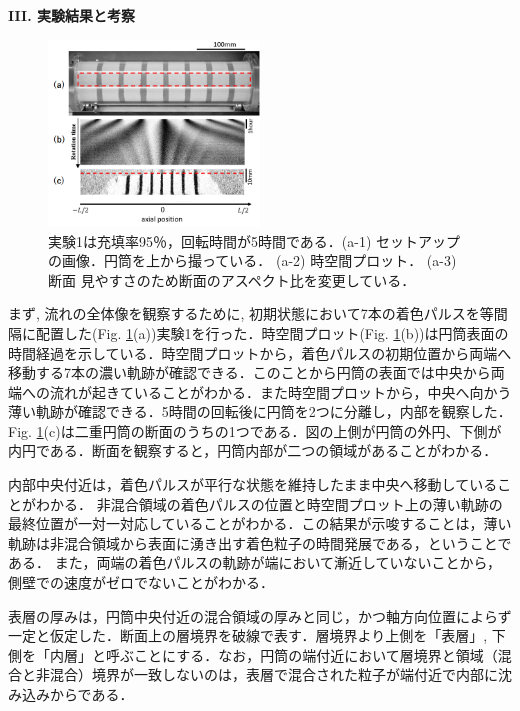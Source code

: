 \documentclass[prl,twocolumn,superscriptaddress]{revtex4}
\begin{document}
{\bf I\hspace{-.1em}I\hspace{-.1em}I. 実験結果と考察} \\
\begin{figure}[tb]
	\centering
	\includegraphics[width=0.5\textwidth]{figure/24_gray.png}
	\caption{実験1は充填率95％，回転時間が5時間である．(a-1) セットアップの画像．円筒を上から撮っている． (a-2) 時空間プロット． (a-3) 断面 見やすさのため断面のアスペクト比を変更している．}
	\label{fig:Expt.1}
\end{figure}

まず, 流れの全体像を観察するために, 初期状態において7本の着色パルスを等間隔に配置した(Fig. \ref{fig:Expt.1}(a))実験1を行った．時空間プロット(Fig. \ref{fig:Expt.1}(b))は円筒表面の時間経過を示している．時空間プロットから，着色パルスの初期位置から両端へ移動する7本の濃い軌跡が確認できる．このことから円筒の表面では中央から両端への流れが起きていることがわかる．また時空間プロットから，中央へ向かう薄い軌跡が確認できる．5時間の回転後に円筒を2つに分離し，内部を観察した．Fig. \ref{fig:Expt.1}(c)は二重円筒の断面のうちの1つである．図の上側が円筒の外円、下側が内円である．断面を観察すると，円筒内部が二つの領域があることがわかる．

内部中央付近は，着色パルスが平行な状態を維持したまま中央へ移動していることがわかる．
非混合領域の着色パルスの位置と時空間プロット上の薄い軌跡の最終位置が一対一対応していることがわかる．この結果が示唆することは，薄い軌跡は非混合領域から表面に湧き出す着色粒子の時間発展である，ということである．
また，両端の着色パルスの軌跡が端において漸近していないことから，側壁での速度がゼロでないことがわかる．

表層の厚みは，円筒中央付近の混合領域の厚みと同じ，かつ軸方向位置によらず一定と仮定した．断面上の層境界を破線で表す．層境界より上側を「表層」, 下側を「内層」と呼ぶことにする．なお，円筒の端付近において層境界と領域（混合と非混合）境界が一致しないのは，表層で混合された粒子が端付近で内部に沈み込みからである．
\end{document}
